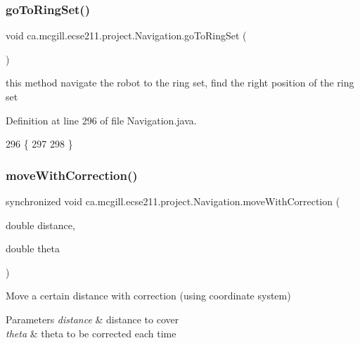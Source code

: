 \mbox{\label{classca_1_1mcgill_1_1ecse211_1_1project_1_1_navigation_a0016a23ab5d544148a09948fb1a40e4c}} 
\subsubsection{\texorpdfstring{go\+To\+Ring\+Set()}{goToRingSet()}}
{\footnotesize\ttfamily void ca.\+mcgill.\+ecse211.\+project.\+Navigation.\+go\+To\+Ring\+Set (\begin{DoxyParamCaption}{ }\end{DoxyParamCaption})}

this method navigate the robot to the ring set, find the right position of the ring set 

Definition at line 296 of file Navigation.\+java.


\begin{DoxyCode}
296                             \{
297     
298   \}
\end{DoxyCode}
\mbox{\label{classca_1_1mcgill_1_1ecse211_1_1project_1_1_navigation_a48eeb9ae2da23664421e8da5642054c7}} 
\subsubsection{\texorpdfstring{move\+With\+Correction()}{moveWithCorrection()}}
{\footnotesize\ttfamily synchronized void ca.\+mcgill.\+ecse211.\+project.\+Navigation.\+move\+With\+Correction (\begin{DoxyParamCaption}\item[{double}]{distance,  }\item[{double}]{theta }\end{DoxyParamCaption})}

Move a certain distance with correction (using coordinate system) 
\begin{DoxyParams}{Parameters}
{\em distance} & distance to cover \\
\hline
{\em theta} & theta to be corrected each time \\
\hline
\end{DoxyParams}


